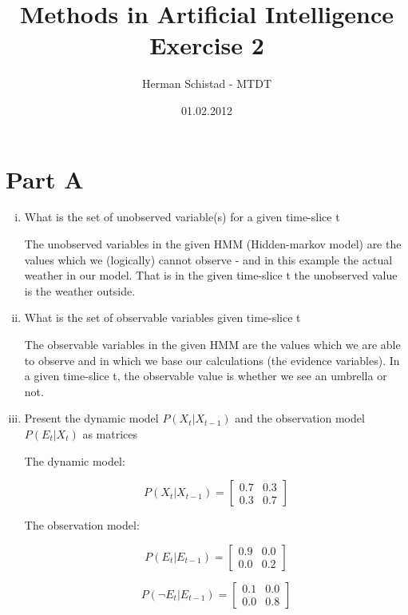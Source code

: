 \documentclass{article}
\title{Methods in Artificial Intelligence \\
        \normalsize Exercise 2}
\author{Herman Schistad - MTDT}
\date{01.02.2012}
\begin{document}
\maketitle

\section*{Part A}
\begin{enumerate}[(i)]
\item What is the set of unobserved variable(s) for a given time-slice t

The unobserved variables in the given HMM (Hidden-markov model) are the values which we (logically) 
cannot observe - and in this example the actual weather in our model. That is in the given time-slice
t the unobserved value is the weather outside.

\item What is the set of observable variables given time-slice t

The observable variables in the given HMM are the values which we are able to observe and in which we
base our calculations (the evidence variables). In a given time-slice t, the observable value is whether
we see an umbrella or not. 

\item Present the dynamic model $P(X_t|X_{t-1})$ and the observation model $P(E_t|X_t)$ as matrices

The dynamic model:

\begin{equation}
P(X_t|X_{t-1}) = \begin{bmatrix}
  0.7 & 0.3 \\
  0.3 & 0.7
\end{bmatrix}
\end{equation}

The observation model:

\begin{equation}
P(E_t|E_{t-1}) =  \begin{bmatrix}
  0.9 & 0.0 \\
  0.0 & 0.2
\end{bmatrix}
\end{equation}

\begin{equation}
P(\neg E_t|E_{t-1}) =  \begin{bmatrix}
  0.1 & 0.0 \\
  0.0 & 0.8
\end{bmatrix}
\end{equation}


\end{enumerate}
\end{document}
